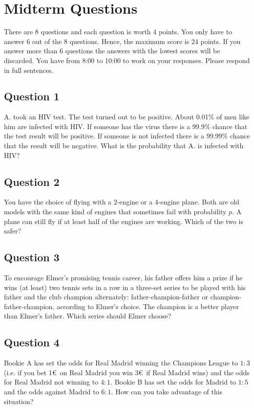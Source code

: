 \documentclass[../main/Notes.tex]{subfiles}
\begin{document}
\section{Midterm Questions}
There are 8 questions and each question is worth 4 points. You only have to answer 6 out of the 8 questions. Hence, the maximum score is 24 points. If you answer more than 6 questions the answers with the lowest scores will be discarded. You have from 8:00 to 10:00 to work on your responses. Please respond in full sentences.

\subsection*{Question 1}
A. took an HIV test. The test turned out to be positive. About 0.01\% of men like him are infected with HIV. If someone has the virus there is a 99.9\% chance that the test result will be positive. If someone is not infected there is a 99.99\% chance that the result will be negative. What is the probability that A. is infected with HIV?

\subsection*{Question 2}
You have the choice of flying with a 2-engine or a 4-engine plane. Both are old models with the same kind of engines that sometimes fail with probability $p$. A plane can still fly if at least half of the engines are working. Which of the two is safer?

\subsection*{Question 3}
To encourage Elmer's promising tennis career, his father offers him a prize if he wins (at least) two tennis sets in a row in a three-set series to be played with his father and the club champion alternately: father-champion-father or champion-father-champion, according to Elmer's choice. The champion is a better player than Elmer's father. Which series should Elmer choose?

\subsection*{Question 4}
Bookie A has set the odds for Real Madrid winning the Champions League to $1:3$ (i.e. if you bet 1\euro\ on Real Madrid you win 3\euro\ if Real Madrid wins) and the odds for Real Madrid not winning to $4:1$. Bookie B has set the odds for Madrid to $1:5$ and the odds against Madrid to $6:1$. How can you take advantage of this situation?
\end{document}
